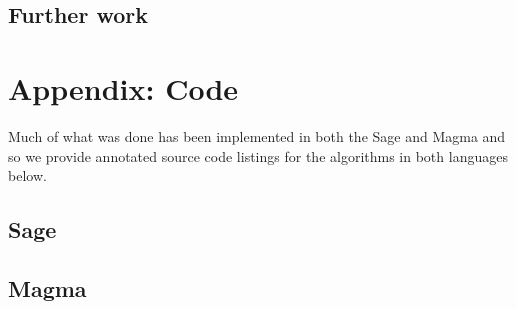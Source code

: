 \documentclass[11pt,a4paper]{report}
\theoremstyle{definition}
\begin{document}
\section{Further work}

\chapter{Appendix: Code}

Much of what was done has been implemented in both the Sage and Magma and so we provide annotated source code listings for the algorithms in both languages below.
 
\section{Sage}


\section{Magma}



\nocite{*}


\end{document}

